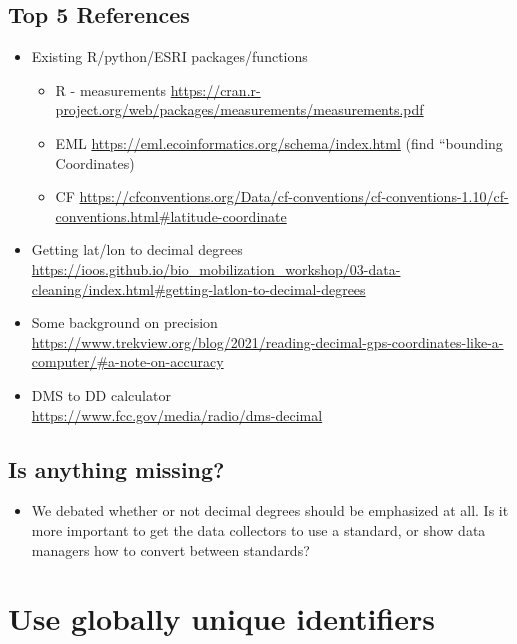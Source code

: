 \documentclass[
  oneside]{book}
\providecommand{\tightlist}{%
  \setlength{\itemsep}{0pt}\setlength{\parskip}{0pt}}
\begin{document}
\hypertarget{top-5-references-4}{%
\subsection{Top 5 References}\label{top-5-references-4}}

\begin{itemize}
\tightlist
\item
  Existing R/python/ESRI packages/functions

  \begin{itemize}
  \tightlist
  \item
    R - measurements \url{https://cran.r-project.org/web/packages/measurements/measurements.pdf}
  \item
    EML \url{https://eml.ecoinformatics.org/schema/index.html} (find ``bounding Coordinates)
  \item
    CF \url{https://cfconventions.org/Data/cf-conventions/cf-conventions-1.10/cf-conventions.html\#latitude-coordinate}
  \end{itemize}
\item
  Getting lat/lon to decimal degrees\\
  \url{https://ioos.github.io/bio_mobilization_workshop/03-data-cleaning/index.html\#getting-latlon-to-decimal-degrees}
\item
  Some background on precision\\
  \url{https://www.trekview.org/blog/2021/reading-decimal-gps-coordinates-like-a-computer/\#a-note-on-accuracy}
\item
  DMS to DD calculator\\
  \url{https://www.fcc.gov/media/radio/dms-decimal}
\end{itemize}

\hypertarget{is-anything-missing-2}{%
\subsection{Is anything missing?}\label{is-anything-missing-2}}

\begin{itemize}
\tightlist
\item
  We debated whether or not decimal degrees should be emphasized at all. Is it more important to get the data collectors to use a standard, or show data managers how to convert between standards?
\end{itemize}

\hypertarget{use-globally-unique-identifiers}{%
\section{Use globally unique identifiers}\label{use-globally-unique-identifiers}}
\end{document}
